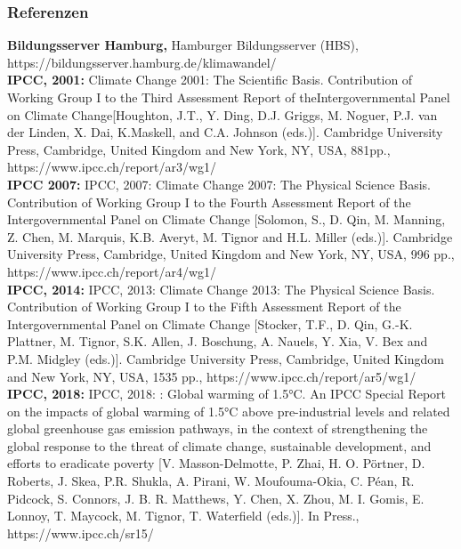 \begin{frame}
	\frametitle{Referenzen}
	\small{
	\textbf{Bildungsserver Hamburg,} Hamburger Bildungsserver (HBS), https://bildungsserver.hamburg.de/klimawandel/ \\

	\textbf{IPCC, 2001:} Climate Change 2001: The Scientific Basis. Contribution of Working Group I to the Third Assessment Report of theIntergovernmental Panel on Climate Change[Houghton, J.T., Y. Ding, D.J. Griggs, M. Noguer, P.J. van der Linden, X. Dai, K.Maskell, and C.A. Johnson (eds.)]. Cambridge University Press, Cambridge, United Kingdom and New York, NY, USA, 881pp., https://www.ipcc.ch/report/ar3/wg1/\\

	\textbf{IPCC 2007:} IPCC, 2007: Climate Change 2007: The Physical Science Basis. Contribution of Working Group I to the Fourth Assessment Report of the Intergovernmental Panel on Climate Change [Solomon, S., D. Qin, M. Manning, Z. Chen, M. Marquis, K.B. Averyt, M. Tignor and H.L. Miller (eds.)]. Cambridge University Press, Cambridge, United Kingdom and New York, NY, USA, 996 pp.,  https://www.ipcc.ch/report/ar4/wg1/\\

	\textbf{IPCC, 2014:} IPCC, 2013: Climate Change 2013: The Physical Science Basis. Contribution of Working Group I to the Fifth Assessment Report of the Intergovernmental Panel on Climate Change [Stocker, T.F., D. Qin, G.-K. Plattner, M. Tignor, S.K. Allen, J. Boschung, A. Nauels, Y. Xia, V. Bex and P.M. Midgley (eds.)]. Cambridge University Press, Cambridge, United Kingdom and New York, NY, USA, 1535 pp., https://www.ipcc.ch/report/ar5/wg1/\\

	\textbf{IPCC, 2018:} IPCC, 2018: : Global warming of 1.5°C. An IPCC Special Report on the impacts of global warming of 1.5°C above pre-industrial levels and related global greenhouse gas emission pathways, in the context of strengthening the global response to the threat of climate change, sustainable development, and efforts to eradicate poverty [V. Masson-Delmotte, P. Zhai, H. O. Pörtner, D. Roberts, J. Skea, P.R. Shukla, A. Pirani, W. Moufouma-Okia, C. Péan, R. Pidcock, S. Connors, J. B. R. Matthews, Y. Chen, X. Zhou, M. I. Gomis, E. Lonnoy, T. Maycock, M. Tignor, T. Waterfield (eds.)]. In Press., https://www.ipcc.ch/sr15/\\
	}
\end{frame}

